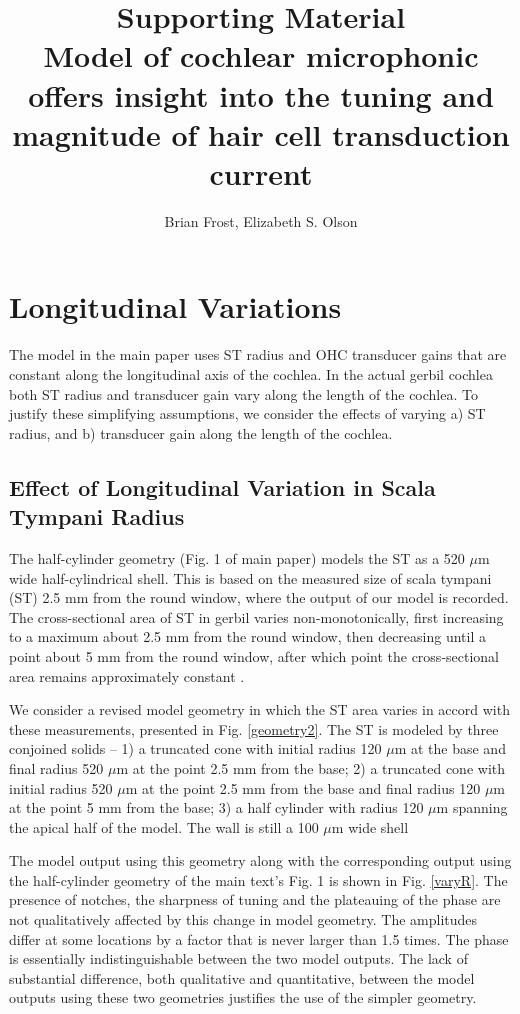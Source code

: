 \documentclass{article}
\title{Supporting Material\\\vspace*{5mm}Model of cochlear microphonic offers insight into the tuning and magnitude of hair cell transduction current\\\vspace*{5mm}}
\author{Brian Frost, Elizabeth S. Olson}
\makeatletter
\renewcommand{\maketitle}{\bgroup\setlength{\parindent}{0pt}
\begin{flushleft}
  \textbf{\@title}

  \@author
\end{flushleft}\egroup
}
\makeatother
\begin{document}
\maketitle

\clearpage

\section{ {Longitudinal Variations}}
\par{ {The model in the main paper uses ST radius and OHC transducer gains that are constant along the longitudinal axis of the cochlea. In the actual gerbil cochlea both ST radius and transducer gain vary along the length of the cochlea. To justify these simplifying assumptions, we consider the effects of varying a) ST radius, and b) transducer gain along the length of the cochlea.}}
 \subsection{Effect of Longitudinal Variation in Scala Tympani Radius}
\par{ {The half-cylinder geometry (Fig. 1 of main paper) models the ST as a 520 $\mu$m wide half-cylindrical shell. This is based on the measured size of scala tympani (ST) 2.5 mm from the round window, where the output of our model is recorded. The cross-sectional area of ST in gerbil varies non-monotonically, first increasing to a maximum about 2.5 mm from the round window, then decreasing until a point about 5 mm from the round window, after which point the cross-sectional area remains approximately constant \cite{plassmann}.}}
\par{ {We consider a revised model geometry in which the ST area varies in accord with these measurements, presented in Fig. \ref{geometry2}. The ST is modeled by three conjoined solids -- 1) a truncated cone with initial radius 120 $\mu$m at the base and final radius 520 $\mu$m at the point 2.5 mm from the base; 2) a truncated cone with initial radius 520 $\mu$m at the point 2.5 mm from the base and final radius 120 $\mu$m at the point 5 mm from the base; 3) a half cylinder with radius 120 $\mu$m spanning the apical half of the model. The wall is still a 100 $\mu$m wide shell }}
\par{ {The model output using this geometry along with the corresponding output using the half-cylinder geometry of the main text's Fig. 1 is shown in Fig. \ref{varyR}. The presence of notches, the sharpness of tuning and the plateauing of the phase are not qualitatively affected by this change in model geometry. The amplitudes differ at some locations by a factor that is never larger than 1.5 times. The phase is essentially indistinguishable between the two model outputs. The lack of substantial difference, both qualitative and quantitative, between the model outputs using these two geometries justifies the use of the simpler geometry.}}
\end{document}
